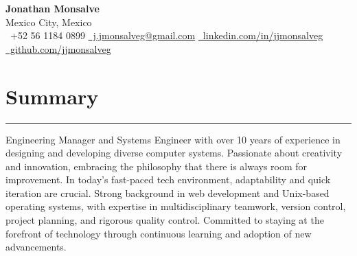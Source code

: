 \documentclass[a4paper,10pt]{article}
\begin{document}
\begin{center}
    {\LARGE \textbf{Jonathan Monsalve}} \\[0.5em]
    Mexico City, Mexico \\
    \faPhone\ +52 56 1184 0899 \hspace{1em}
    \href{mailto:j.jmonsalveg@gmail.com}{\faEnvelope\ j.jmonsalveg@gmail.com} \hspace{1em}
    \href{https://www.linkedin.com/in/jjmonsalveg/}{\faLinkedin\ linkedin.com/in/jjmonsalveg} \hspace{1em}
    \href{https://github.com/jjmonsalveg}{\faGithub\ github.com/jjmonsalveg}
\end{center}

\vspace{0.5em}

\newcommand{\sectionline}{
	\noindent\rule{\linewidth}{0.4pt}\vspace{0.1em}
}

\section*{Summary}
\sectionline
Engineering Manager and Systems Engineer with over 10 years of experience in
designing and developing diverse computer systems. Passionate about creativity
and innovation, embracing the philosophy that there is always room for
improvement. In today's fast-paced tech environment, adaptability and quick
iteration are crucial. Strong background in web development and Unix-based
operating systems, with expertise in multidisciplinary teamwork, version
control, project planning, and rigorous quality control. Committed to staying
at the forefront of technology through continuous learning and adoption of
new advancements.

\end{document}
